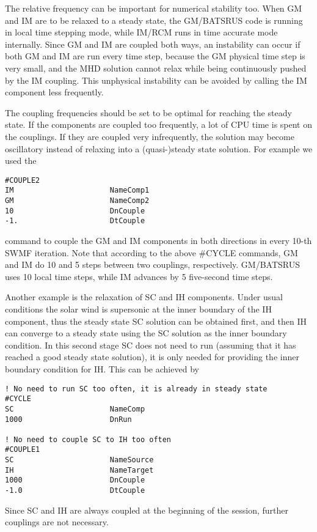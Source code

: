 The relative frequency can be important for numerical
stability too. When GM and IM are to be relaxed
to a steady state, the GM/BATSRUS code is running in 
local time stepping mode, while IM/RCM runs in time 
accurate mode internally. Since GM and IM are coupled
both ways, an instability can occur if both GM and IM
are run every time step, because the GM physical time
step is very small, and the MHD solution cannot relax
while being continuously pushed by the IM coupling.
This unphysical instability can be avoided by calling the
IM component less frequently.

The coupling frequencies should be set to be optimal
for reaching the steady state. If the components are
coupled too frequently, a lot of CPU time is spent
on the couplings. If they are coupled very infrequently,
the solution may become oscillatory instead of relaxing
into a (quasi-)steady state solution. For example
we used the
\begin{verbatim}
#COUPLE2
IM                      NameComp1
GM                      NameComp2
10                      DnCouple
-1.                     DtCouple
\end{verbatim}
command to couple the GM and IM components in both directions
in every 10-th SWMF iteration.
Note that according to the above \#CYCLE commands,
GM and IM do 10 and 5 steps between two couplings,
respectively. GM/BATSRUS uses 10 local time steps,
while IM advances by 5 five-second time steps.

Another example is the relaxation of SC and IH components.
Under usual conditions the solar wind is supersonic at the 
inner boundary of the IH component, thus the steady state SC
solution can be obtained first, and then IH can converge
to a steady state using the SC solution as the inner boundary 
condition. In this second stage SC does not need to run
(assuming that it has reached a good steady state solution),
it is only needed for providing the inner boundary condition for IH.
This can be achieved by
\begin{verbatim}
! No need to run SC too often, it is already in steady state
#CYCLE
SC                      NameComp
1000                    DnRun

! No need to couple SC to IH too often
#COUPLE1
SC                      NameSource
IH                      NameTarget
1000                    DnCouple
-1.0                    DtCouple
\end{verbatim}
Since SC and IH are always coupled at the beginning of the session,
further couplings are not necessary.

